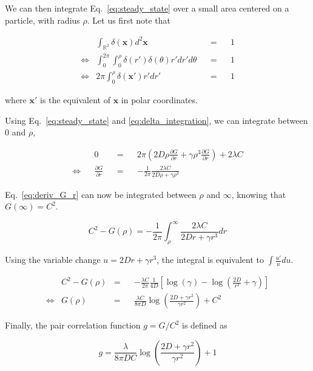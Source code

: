 We can then integrate Eq.~\ref{eq:steady_state} over a small
area centered on a particle, with radius $\rho$. Let us first note
that

\begin{align}
& \int_{\mathbb{R}^{2}}\delta(\boldsymbol{x})d^{2}\boldsymbol{x} & & = & & 1\nonumber \\
\Leftrightarrow & \int_{0}^{2\pi}\int_{0}^{\rho}\delta(r')\delta(\theta)r'dr'd\theta & & = & & 1\nonumber \\
\Leftrightarrow & 2\pi\int_{0}^{\rho}\delta(\boldsymbol{x'})r'dr' & & = & & 1\label{eq:delta_integration}
\end{align}

where $\boldsymbol{x'}$ is the equivalent of $\boldsymbol{x}$ in polar coordinates. 

Using Eq.~\ref{eq:steady_state} and \ref{eq:delta_integration},
we can integrate between 0 and $\rho$, 

\begin{align}
 & & 0 & & = & & 2\pi\left(2D\rho\frac{\partial G}{\partial r}+\gamma\rho^{3}\frac{\partial G}{\partial r}\right)+2\lambda C\nonumber \\
\Leftrightarrow & & \frac{\partial G}{\partial r} & & = & & -\frac{1}{2\pi}\frac{2\lambda C}{2D\rho+\gamma\rho^{3}}\label{eq:deriv_G_r}
\end{align}

Eq.~\ref{eq:deriv_G_r} can now be integrated between $\rho$ and $\infty$, knowing that $G(\infty)=C^{2}.$

\begin{equation}
 C^{2}-G(\rho) = -\frac{1}{2\pi}{\displaystyle \int_{\rho}^{\infty}}\frac{2\lambda C}{2Dr+\gamma r^{3}}dr\label{eq:deriv_G_r_int1}
\end{equation}

Using the variable change $u=2Dr+\gamma r^{3}$, the integral is equivalent
to $\int\frac{u'}{u}du$.

\begin{align}
 & C^{2}-G(\rho) & = & & -\frac{\lambda C}{2\pi}\frac{1}{4D}[\log(\gamma)-\log(\frac{2D}{r^{2}}+\gamma)]\label{eq:deriv_G_rint2}\\
\Leftrightarrow & G(\rho) & = & & \frac{\lambda C}{8\pi D}\log\left(\frac{2D+\gamma r^{2}}{\gamma r^{2}}\right)+C^{2}\label{eq:G_rho}
\end{align}

Finally, the pair correlation function $g=G/C^{2}$ is defined as

\begin{equation}
g=\frac{\lambda}{8\pi DC}\log\left(\frac{2D+\gamma r^{2}}{\gamma r^{2}}\right)+1
\end{equation}


